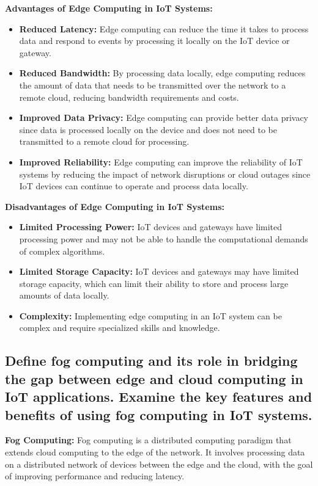 \documentclass[12pt, a4paper, oneside]{article}
\begin{document}
\textbf{Advantages of Edge Computing in IoT Systems:}

\begin{itemize}
	\item \textbf{Reduced Latency:} Edge computing can reduce the time it takes to process data and respond to events by processing it locally on the IoT device or gateway.
	\item \textbf{Reduced Bandwidth:} By processing data locally, edge computing reduces the amount of data that needs to be transmitted over the network to a remote cloud, reducing bandwidth requirements and costs.
	\item \textbf{Improved Data Privacy:} Edge computing can provide better data privacy since data is processed locally on the device and does not need to be transmitted to a remote cloud for processing.
	\item \textbf{Improved Reliability:} Edge computing can improve the reliability of IoT systems by reducing the impact of network disruptions or cloud outages since IoT devices can continue to operate and process data locally.
\end{itemize}

\textbf{Disadvantages of Edge Computing in IoT Systems:}

\begin{itemize}
	\item \textbf{Limited Processing Power:} IoT devices and gateways have limited processing power and may not be able to handle the computational demands of complex algorithms.
	\item \textbf{Limited Storage Capacity:} IoT devices and gateways may have limited storage capacity, which can limit their ability to store and process large amounts of data locally.
	\item \textbf{Complexity:} Implementing edge computing in an IoT system can be complex and require specialized skills and knowledge.
\end{itemize}

\subsection{Define fog computing and its role in bridging the gap between edge and cloud computing in IoT applications. Examine the key features and benefits of using fog computing in IoT systems.}
\textbf{Fog Computing:} Fog computing is a distributed computing paradigm that extends cloud computing to the edge of the network. It involves processing data on a distributed network of devices between the edge and the cloud, with the goal of improving performance and reducing latency.
\end{document}
